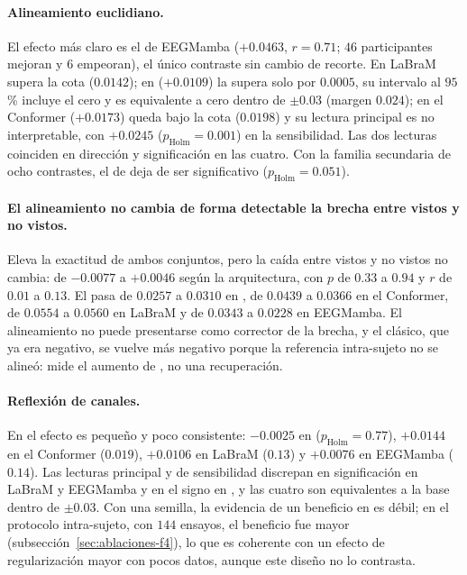 \paragraph{Alineamiento euclidiano.} El efecto más claro es el de EEGMamba ($+0.0463$, $r = 0.71$; $46$
participantes mejoran y $6$ empeoran), el único contraste sin cambio de recorte. En LaBraM supera la cota
($0.0142$); en \eegnet{} ($+0.0109$) la supera solo por $0.0005$, su intervalo al $95$\,\% incluye el cero y
es equivalente a cero dentro de $\pm 0.03$ (margen $0.024$); en el Conformer ($+0.0173$) queda bajo la cota
($0.0198$) y su lectura principal es no interpretable, con $+0.0245$ ($p_{\text{Holm}} = 0.001$) en la
sensibilidad. Las dos lecturas coinciden en dirección y significación en las cuatro. Con la familia secundaria
de ocho contrastes, el de \eegnet{} deja de ser significativo ($p_{\text{Holm}} = 0.051$).

\paragraph{El alineamiento no cambia de forma detectable la brecha entre vistos y no vistos.} Eleva la
exactitud de ambos conjuntos, pero la caída entre vistos y no vistos no cambia: de $-0.0077$ a $+0.0046$
según la arquitectura, con $p$ de $0.33$ a $0.94$ y $r$ de $0.01$ a $0.13$. El \dsi{} pasa de $0.0257$ a
$0.0310$ en \eegnet{}, de $0.0439$ a $0.0366$ en el Conformer, de $0.0554$ a $0.0560$ en LaBraM y de $0.0343$
a $0.0228$ en EEGMamba. El alineamiento no puede presentarse como corrector de la brecha, y el \dsi{}
clásico, que ya era negativo, se vuelve más negativo porque la referencia intra-sujeto no se alineó: mide el
aumento de \loso{}, no una recuperación.

\paragraph{Reflexión de canales.} En \loso{} el efecto es pequeño y poco consistente: $-0.0025$ en \eegnet{}
($p_{\text{Holm}} = 0.77$), $+0.0144$ en el Conformer ($0.019$), $+0.0106$ en LaBraM ($0.13$) y $+0.0076$ en
EEGMamba ($0.14$). Las lecturas principal y de sensibilidad discrepan en significación en LaBraM y EEGMamba y
en el signo en \eegnet{}, y las cuatro son equivalentes a la base dentro de $\pm 0.03$. Con una semilla, la
evidencia de un beneficio en \loso{} es débil; en el protocolo intra-sujeto, con $144$ ensayos, el beneficio
fue mayor (subsección~\ref{sec:ablaciones-f4}), lo que es coherente con un efecto de regularización mayor con
pocos datos, aunque este diseño no lo contrasta.

